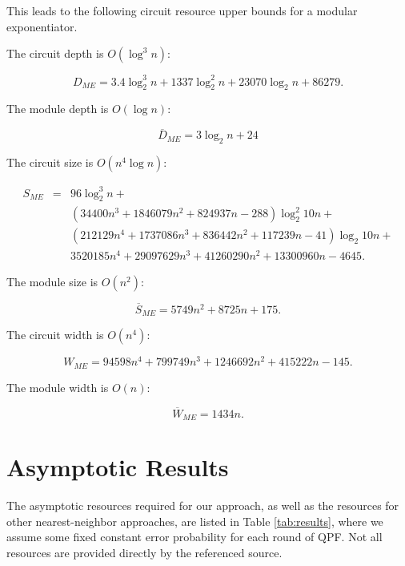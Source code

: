 \documentclass[twoside]{article}
\begin{document}
This leads to the following circuit resource upper bounds for a modular exponentiator.

The circuit depth is $O(\log^3 n)$:

\begin{equation}
D_{ME} = 3.4\log_2^3 n + 1337\log_2^2 n + 23070\log_2 n + 86279\text{.}
\end{equation}

The module depth is $O(\log n)$:

\begin{equation}
\overline{D}_{ME} = 3\log_2 n + 24
\end{equation}

The circuit size is $O(n^4 \log n)$:

\begin{eqnarray}
S_{ME} & = & 96 \log_2^3 n + \nonumber \\
       &   & (34400 n^3 + 1846079 n^2 + 824937 n - 288)\log_2^2 10n + \nonumber \\
       &   & (212129 n^4 + 1737086 n^3 + 836442 n^2 + 117239 n - 41) \log_2 10n + \nonumber \\
       &   & 3520185 n^4 + 29097629 n^3 + 41260290 n^2 + 13300960 n - 4645\text{.}
\end{eqnarray}

The module size is $O(n^2)$:

\begin{equation}
\overline{S}_{ME} = 5749n^2 + 8725n +175\text{.}
\end{equation}

The circuit width is $O(n^4)$:

\begin{equation}
W_{ME} = 94598n^4 + 799749 n^3 + 1246692 n^2 + 415222 n - 145\text{.}
\end{equation}

The module width is $O(n)$:

\begin{equation}
\overline{W}_{ME} = 1434n\text{.}
\end{equation}

%
\section{Asymptotic Results}
\label{sec:results}

The asymptotic resources required for our approach,
as well as the resources for other nearest-neighbor approaches,
are listed in Table \ref{tab:results},
where we assume some fixed constant error
probability for each round of QPF. Not all resources are
provided directly by the referenced source.
\end{document}
